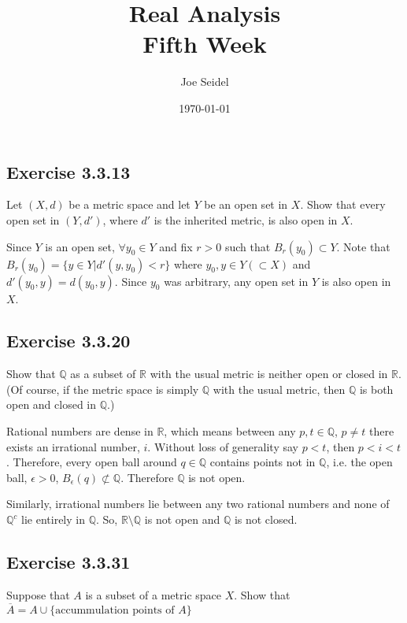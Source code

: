 \documentclass{tufte-book}
\title{Real Analysis\\Fifth Week }
\author{Joe Seidel}
\date{\today}
\theoremstyle{mytheoremstyle}
\theoremstyle{mylemstyle}
\theoremstyle{mydefstyle}
\begin{document}
\maketitle
{}
\newpage
{}

\subsection{Exercise 3.3.13}
Let $(X,d)$ be a metric space and let $Y$ be an open set in $X$.  Show that every open set in $(Y,d')$, where $d'$ is the inherited metric, is also open in $X$.

Since $Y$ is an open set, $\forall y_0 \in Y$ and fix $r > 0$ such that $B_r(y_0) \subset Y$. Note that $B_r(y_0) = \{ y \in Y | d'(y,y_0) < r\}$ where $y_0, y \in Y (\subset X)$ and $d'(y_0, y) = d(y_0, y)$.  Since $y_0$ was arbitrary, any open set in $Y$ is also open in $X$.

\subsection{Exercise 3.3.20}
Show that $\mathbb{Q}$ as a subset of $\mathbb{R}$ with the usual metric is neither open or closed in $\mathbb{R}$.  (Of course, if the metric space is simply $\mathbb{Q}$ with the usual metric, then $\mathbb{Q}$ is both open and closed in $\mathbb{Q}$.)

Rational numbers are dense in $\mathbb{R}$, which means between any $p,t \in \mathbb{Q}$, $p \neq t$ there exists an irrational number, $i$.  Without loss of generality say $p < t$, then $p < i < t$.  Therefore, every open ball around $q \in \mathbb{Q}$ contains points not in $\mathbb{Q}$, i.e. the open ball, $\epsilon > 0$, $B_\epsilon(q) \not\subset \mathbb{Q}$.  Therefore $\mathbb{Q}$ is not open.

Similarly, irrational numbers lie between any two rational numbers and none of $\mathbb{Q}^c$ lie entirely in $\mathbb{Q}$.  So, $\mathbb{R}\setminus\mathbb{Q}$ is not open and $\mathbb{Q}$ is not closed.

\subsection{Exercise 3.3.31}
Suppose that $A$ is a subset of a metric space $X$.  Show that $\overline{A} = A \cup \{ \text{accummulation points of }A\}$
\end{document}
